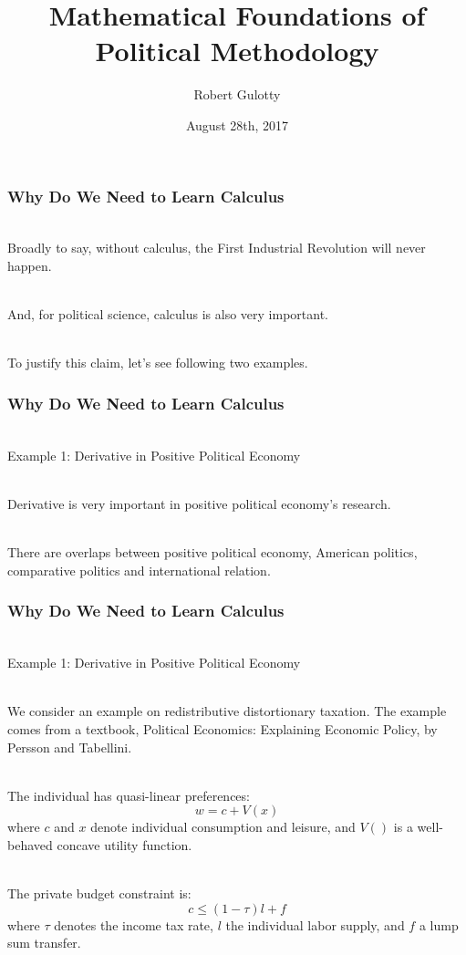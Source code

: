 \documentclass{beamer}
\title[PLSC 43401] %
{Mathematical Foundations of Political Methodology}
\author{Robert Gulotty}
\institute[University of Chicago]{Associate Professor\\Department of Political Science \\  University of Chicago}
\date{August 28th, 2017}
\numberwithin{equation}{section}
\begin{document}
\begin{frame}
\titlepage
\end{frame}



\begin{frame}
\frametitle{Why Do We Need to Learn Calculus}

\ \\Broadly to say, without calculus, the First Industrial Revolution will never happen. \pause

\ \\And, for political science, calculus is also very important. \pause

\ \\To justify this claim, let's see following two examples.

\end{frame}



\begin{frame}
\frametitle{Why Do We Need to Learn Calculus}

\ \\Example 1: Derivative in Positive Political Economy \pause

\ \\Derivative is very important in positive political economy's research. \pause

\ \\There are overlaps between positive political economy, American politics, comparative politics and international relation.

\end{frame}



\begin{frame}
\frametitle{Why Do We Need to Learn Calculus}

\ \\Example 1: Derivative in Positive Political Economy \pause

\ \\We consider an example on redistributive distortionary taxation. The example comes from a textbook, Political Economics: Explaining Economic Policy, by Persson and Tabellini. \pause

\ \\The individual has quasi-linear preferences:
$$w = c + V(x)$$
where $c$ and $x$ denote individual consumption and leisure, and $V()$ is a well-behaved concave utility function. \pause

\ \\The private budget constraint is:
$$c \leq (1 - \tau)l + f$$
where $\tau$ denotes the income tax rate, $l$ the individual labor supply, and $f$ a lump sum transfer.

\end{frame}
\end{document}

